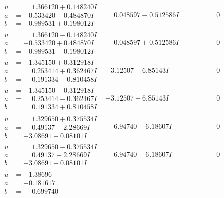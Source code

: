 \documentclass[1p]{elsarticle_modified}
\theoremstyle{definition}
\begin{document}
$$\begin{array}{c|c|c}
\begin{aligned}
u &= \phantom{-}1.366120 + 0.148240 I \\
a &= -0.533420 - 0.484870 I \\
b &= -0.989531 + 0.198012 I\end{aligned}
 & \phantom{-}0.048597 - 0.512586 I & \phantom{-0.000000 } 0 \\ \hline\begin{aligned}
u &= \phantom{-}1.366120 - 0.148240 I \\
a &= -0.533420 + 0.484870 I \\
b &= -0.989531 - 0.198012 I\end{aligned}
 & \phantom{-}0.048597 + 0.512586 I & \phantom{-0.000000 } 0 \\ \hline\begin{aligned}
u &= -1.345150 + 0.312918 I \\
a &= \phantom{-}0.253414 + 0.362467 I \\
b &= \phantom{-}0.191334 - 0.810458 I\end{aligned}
 & -3.12507 + 6.85143 I & \phantom{-0.000000 } 0 \\ \hline\begin{aligned}
u &= -1.345150 - 0.312918 I \\
a &= \phantom{-}0.253414 - 0.362467 I \\
b &= \phantom{-}0.191334 + 0.810458 I\end{aligned}
 & -3.12507 - 6.85143 I & \phantom{-0.000000 } 0 \\ \hline\begin{aligned}
u &= \phantom{-}1.329650 + 0.375534 I \\
a &= \phantom{-}0.49137 + 2.28669 I \\
b &= -3.08691 - 0.08101 I\end{aligned}
 & \phantom{-}6.94740 - 6.18607 I & \phantom{-0.000000 } 0 \\ \hline\begin{aligned}
u &= \phantom{-}1.329650 - 0.375534 I \\
a &= \phantom{-}0.49137 - 2.28669 I \\
b &= -3.08691 + 0.08101 I\end{aligned}
 & \phantom{-}6.94740 + 6.18607 I & \phantom{-0.000000 } 0 \\ \hline\begin{aligned}
u &= -1.38696\phantom{ +0.000000I} \\
a &= -0.181617\phantom{ +0.000000I} \\
b &= \phantom{-}0.699740\phantom{ +0.000000I}\end{aligned}

\end{array}$$
\end{document}

